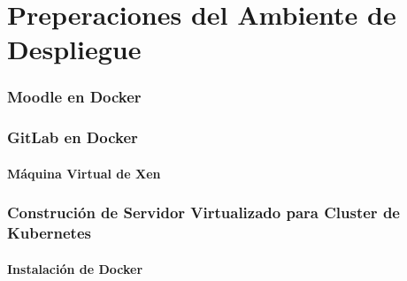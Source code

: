 
\section{Preperaciones del Ambiente de Despliegue}

\subsubsection{Moodle en Docker}

\subsubsection{GitLab en Docker}

  
\paragraph{Máquina Virtual de Xen}
\subsubsection{Construción de Servidor Virtualizado para Cluster de Kubernetes}
\paragraph{Instalación de Docker}
